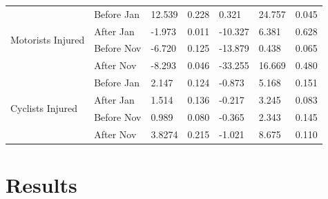 \documentclass[10pt,journal,compsoc]{IEEEtran}
\begin{document}
\begin{table}[]
\begin{tabular}{|l|l|l|l|l|l|l|}
\multirow{4}{*}{Motorists Injured}   & Before Jan & 12.539      & 0.228 & 0.321                  & 24.757               & 0.045   \\ \cline{2-7} 
                                     & After Jan  & -1.973      & 0.011 & -10.327                & 6.381                & 0.628   \\ \cline{2-7} 
                                     & Before Nov & -6.720      & 0.125 & -13.879                & 0.438                & 0.065   \\ \cline{2-7} 
                                     & After Nov  & -8.293      & 0.046 & -33.255                & 16.669               & 0.480   \\ \hline
\multirow{4}{*}{Cyclists Injured}    & Before Jan & 2.147       & 0.124 & -0.873                 & 5.168                & 0.151   \\ \cline{2-7} 
                                     & After Jan  & 1.514       & 0.136 & -0.217                 & 3.245                & 0.083   \\ \cline{2-7} 
                                     & Before Nov & 0.989       & 0.080 & -0.365                 & 2.343                & 0.145   \\ \cline{2-7} 
                                     & After Nov  & 3.8274      & 0.215 & -1.021                 & 8.675                & 0.110   \\ \hline
\end{tabular}
\end{table}


\section{Results}
\end{document}
